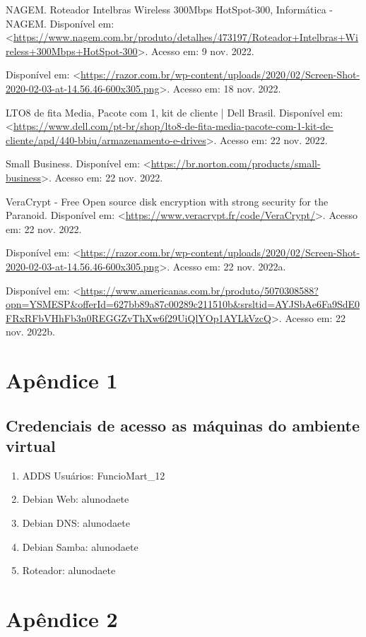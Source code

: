 \documentclass[12pt]{article}
\begin{document}
NAGEM. Roteador Intelbras Wireless 300Mbps HotSpot-300, Informática - NAGEM. Disponível em:
<\url{https://www.nagem.com.br/produto/detalhes/473197/Roteador+Intelbras+Wireless+300Mbps+HotSpot-300}>. Acesso em: 9 nov. 2022.

Disponível em: <\url{https://razor.com.br/wp-content/uploads/2020/02/Screen-Shot-2020-02-03-at-14.56.46-600x305.png}>. Acesso em: 18 nov. 2022.

LTO8 de fita Media, Pacote com 1, kit de cliente | Dell Brasil. Disponível em: <\url{https://www.dell.com/pt-br/shop/lto8-de-fita-media-pacote-com-1-kit-de-cliente/apd/440-bbiu/armazenamento-e-drives}>. Acesso em: 22 nov. 2022.

Small Business. Disponível em: <\url{https://br.norton.com/products/small-business}>. Acesso em: 22 nov. 2022.

VeraCrypt - Free Open source disk encryption with strong security for the Paranoid. Disponível em: <\url{https://www.veracrypt.fr/code/VeraCrypt/}>. Acesso em: 22 nov. 2022.

Disponível em: <\url{https://razor.com.br/wp-content/uploads/2020/02/Screen-Shot-2020-02-03-at-14.56.46-600x305.png}>. Acesso em: 22 nov. 2022a.

Disponível em: <\url{https://www.americanas.com.br/produto/5070308588?opn=YSMESP&offerId=627bb89a87c00289c211510b&srsltid=AYJSbAe6Fa9SdE0FRxRFbVHhFb3n0REGGZvThXw6f29UiQlYOp1AYLkVzcQ}>. Acesso em: 22 nov. 2022b.
\newpage

\section{Apêndice 1}

\subsection{Credenciais de acesso as máquinas do ambiente virtual}

\begin{enumerate}
    \item ADDS Usuários: FuncioMart\_12
    \item Debian Web: alunodaete
    \item Debian DNS: alunodaete
    \item Debian Samba: alunodaete
    \item Roteador: alunodaete
\end{enumerate}

\newpage

\section{Apêndice 2}
\end{document}
